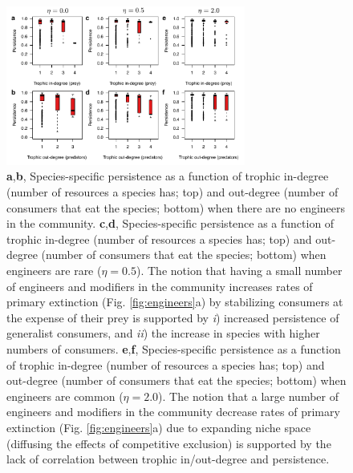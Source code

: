 \documentclass[twocolumn,preprintnumbers,amsmath,amssymb,superscriptaddress,linenumbers]{revtex4-1}
\begin{document}
\begin{figure}[h!]
\centering
\includegraphics[width=0.7\textwidth]{fig_indeng_combined.pdf}
\caption{
\textbf{a},\textbf{b}, Species-specific persistence as a function of trophic in-degree (number of resources a species has; top) and out-degree (number of consumers that eat the species; bottom) when there are no engineers in the community. 
\textbf{c},\textbf{d}, Species-specific persistence as a function of trophic in-degree (number of resources a species has; top) and out-degree (number of consumers that eat the species; bottom) when engineers are rare ($\eta = 0.5$).
The notion that having a small number of engineers and modifiers in the community increases rates of primary extinction (Fig. \ref{fig:engineers}a) by stabilizing consumers at the expense of their prey is supported by \emph{i}) increased persistence of generalist consumers, and \emph{ii}) the increase in species with higher numbers of consumers.
\textbf{e},\textbf{f}, Species-specific persistence as a function of trophic in-degree (number of resources a species has; top) and out-degree (number of consumers that eat the species; bottom) when engineers are common ($\eta = 2.0$).
The notion that a large number of engineers and modifiers in the community decrease rates of primary extinction (Fig. \ref{fig:engineers}a) due to expanding niche space (diffusing the effects of competitive exclusion) is supported by the lack of correlation between trophic in/out-degree and persistence.
}
\label{fig:indeng}
\end{figure}
\end{document}
